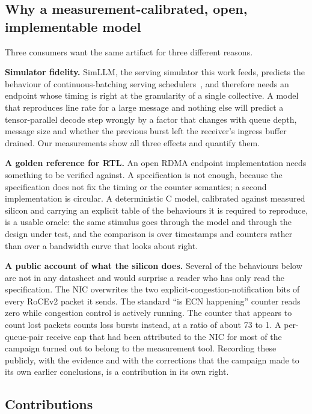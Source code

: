 \subsection{Why a measurement-calibrated, open, implementable model}

Three consumers want the same artifact for three different reasons.

\textbf{Simulator fidelity.} SimLLM, the serving simulator this work feeds,
predicts the behaviour of continuous-batching serving
schedulers~\cite{vllm2023}, and therefore needs an endpoint whose timing is
right at the granularity of a single collective. A model that reproduces line
rate for a large message and nothing else will predict a tensor-parallel decode step wrongly by a factor that
changes with queue depth, message size and whether the previous burst left the
receiver's ingress buffer drained. Our measurements show all three effects and
quantify them.

\textbf{A golden reference for RTL.} An open RDMA endpoint implementation needs
something to be verified against. A specification is not enough, because the
specification does not fix the timing or the counter semantics; a second
implementation is circular. A deterministic C model, calibrated against
measured silicon and carrying an explicit table of the behaviours it is
required to reproduce, is a usable oracle: the same stimulus goes through the
model and through the design under test, and the comparison is over timestamps
and counters rather than over a bandwidth curve that looks about right.

\textbf{A public account of what the silicon does.} Several of the behaviours
below are not in any datasheet and would surprise a reader who has only read
the specification. The NIC overwrites the two explicit-congestion-notification
bits of every RoCEv2 packet it sends. The standard ``is ECN happening'' counter
reads zero while congestion control is actively running. The counter that
appears to count lost packets counts loss bursts instead, at a ratio of about
73 to 1. A per-queue-pair receive cap that had been attributed to the NIC for
most of the campaign turned out to belong to the measurement tool. Recording
these publicly, with the evidence and with the corrections that the campaign
made to its own earlier conclusions, is a contribution in its own right.

\subsection{Contributions}

